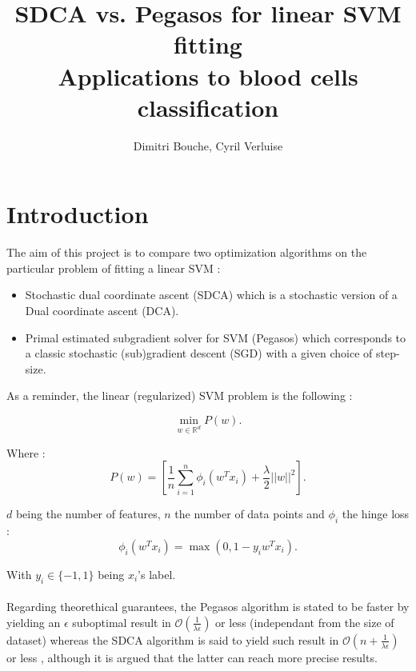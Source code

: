 \documentclass[10pt,a4paper]{article}
\begin{document}
\title{%
  SDCA \cite{2} vs. Pegasos \cite{1} for linear SVM fitting \\
  \large Applications to blood cells classification}

\author{Dimitri Bouche, Cyril Verluise}

\maketitle

\tableofcontents
\newpage

\section{Introduction}

The aim of this project is to compare two optimization algorithms on the particular problem of fitting a linear SVM :

\begin{itemize}
	\item Stochastic dual coordinate ascent (SDCA) \cite{2} which is a stochastic version of a Dual coordinate ascent (DCA).
	\item Primal estimated subgradient solver for SVM (Pegasos) \cite{1} which corresponds to a classic stochastic (sub)gradient descent (SGD) with a given choice of step-size.
\end{itemize}

As a reminder, the linear (regularized) SVM problem is the following :

\begin{equation}\label{P}
\min_{w \in \mathbb{R}^d} P(w).
\end{equation}

Where : $$P(w) = \left [ \frac{1}{n} \sum_{i=1}^n \phi_i (w^T x_i) + \frac{\lambda}{2} || w ||^2 \right ].$$


$d$ being the number of features, $n$ the number of data points and $\phi_i$ the hinge loss : 
$$\phi_i(w^T x_i) = \max(0, 1 - y_iw^Tx_i).$$

With $y_i \in \{-1, 1\}$ being $x_i$'s label.

\paragraph{}

Regarding theorethical guarantees, the Pegasos algorithm is stated to be faster by \cite{1} yielding an $\epsilon$ suboptimal result in $\mathcal{O}(\frac{1}{\lambda \epsilon})$ or less (independant from the size of dataset) whereas the SDCA algorithm is said to yield such result in $\mathcal{O}(n + \frac{1}{\lambda \epsilon})$ or less \cite{2}, although it is argued that the latter can reach more precise results.
\end{document}
